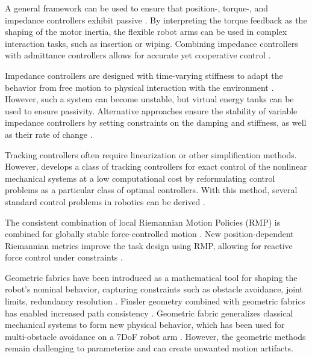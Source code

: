 A general framework can be used to ensure that position-, torque-, and impedance controllers exhibit passive \cite{albu2007unified}. By interpreting the torque feedback as the shaping of the motor inertia, the flexible robot arms can be used in complex interaction tasks, such as insertion or wiping.
Combining impedance controllers with admittance controllers allows for accurate yet cooperative control
\cite{fujiki2022series}.


Impedance controllers are designed with time-varying stiffness to adapt the behavior from free motion to physical interaction with the environment  \cite{ferraguti2013tank}. However, such a system can become unstable, but virtual energy tanks can be used to ensure passivity.
Alternative approaches ensure the stability of variable impedance controllers by setting constraints on the damping and stiffness, as well as their rate of change \cite{kronander2016stability}.


Tracking controllers often require linearization or other simplification methods. However, \cite{udwadia2003new} develops a class of tracking controllers for exact control of the nonlinear mechanical systems at a low computational cost by reformulating control problems as a particular class of optimal controllers. With this method, several standard control problems in robotics can be derived \cite{peters2008unifying}.

The consistent combination of local Riemannian Motion Policies (RMP) is combined for globally stable force-controlled motion \cite{cheng2020rmp}.
New position-dependent Riemannian metrics improve the task design using RMP, allowing for reactive force control under constraints \cite{bylard2021composable}.

Geometric fabrics have been introduced as a mathematical tool for shaping the robot's nominal behavior, capturing constraints such as obstacle avoidance, joint limits, redundancy resolution
\cite{xie2020geometric}.
Finsler geometry combined with geometric fabrics has enabled increased path consistency \cite{ratliff2021generalized}.
Geometric fabric generalizes classical mechanical systems to form new physical behavior, which has been used for multi-obstacle avoidance on a 7DoF robot arm \cite{van2022geometric}.
However, the geometric methods remain challenging to parameterize and can create unwanted motion artifacts.
 
